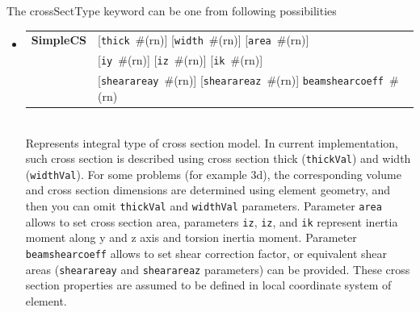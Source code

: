 \documentclass[a4paper]{article}
\makeatletter
\newcommand{\param}[1]{\texttt{#1}} %
\newcommand{\optional}[1]{[#1]} %
\newcommand{\field}[2]{\param{#1}~\#{\tiny(#2)}} %
\newcommand{\optField}[2]{\optional{\field{#1}{#2}}}
\newcommand{\entKeywordInst}[1]{\textbf{#1}} %
\newenvironment{record}[1][]{\begin{tabular}{|ll}}{\end{tabular}\\}
\newcommand{\recentry}[2]{{#1}&{#2}\\}
\newcounter{rcc}
\newenvironment{record}[1][\textwidth]{\setcounter{rcc}{0}\begin{tabular*}{#1}{|ll@{\extracolsep{\fill}}r}}{\end{tabular*}\\}
\newcommand{\recentry}[2]{\ifthenelse{\value{rcc}>0}{&$\backslash$ \\}{\setcounter{rcc}{1}}{#1}&{#2}}
\makeatother
\begin{document}
The crossSectType keyword can be one from following possibilities
\begin{itemize}
\item
\begin{record}[0.9\textwidth]
  \recentry{\entKeywordInst{SimpleCS}}{\optField{thick}{rn} \optField{width}{rn} \optField{area}{rn}}
  \recentry{}{\optField{iy}{rn} \optField{iz}{rn} \optField{ik}{rn}}
  \recentry{}{\optField{shearareay}{rn} \optField{shearareaz}{rn} \field{beamshearcoeff}{rn}}
\end{record}
Represents integral type of cross section model. In current
implementation, such cross section is described using cross section
thick (\param{thickVal}) and width (\param{widthVal}). For some
problems (for example 3d), the corresponding volume and cross section dimensions are
determined using element geometry, and then you can omit \param{thickVal} and \param{widthVal}
parameters. Parameter \param{area} allows to set cross section area, parameters \param{iz}, \param{iz}, and \param{ik} represent 
inertia moment along y and z axis and torsion inertia moment. Parameter \param{beamshearcoeff} allows to set shear correction factor, or equivalent 
shear areas (\param{shearareay} and \param{shearareaz} parameters) can be provided. 
These cross section properties are assumed to be defined in local coordinate system of element.\\


\end{itemize}
\end{document}
